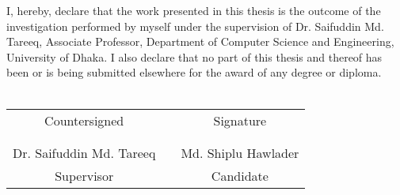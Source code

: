 I, hereby, declare that the work presented in this thesis is the outcome of the investigation performed by myself under the supervision
of Dr. Saifuddin Md. Tareeq, Associate Professor, Department of Computer Science and Engineering, University of Dhaka. I also declare that no part of this thesis and thereof has been or is being submitted elsewhere for the award of any degree or diploma.
\\
\\
\begin{center}
\setlength{\tabcolsep}{25pt}
\begin{tabular}{c c c}

Countersigned & & Signature \\

 & &\\
 & &\\

Dr. Saifuddin Md. Tareeq & & Md. Shiplu Hawlader \\
Supervisor & & Candidate\\

\end{tabular}
\end{center}

